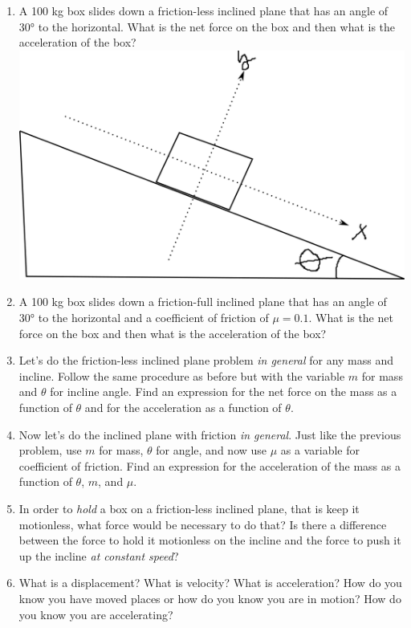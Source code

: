\begin{enumerate}
\item A 100 kg box slides down a friction-less inclined plane that has an angle of \ang{30} to the horizontal. What is the net force on the box and then what is the acceleration of the box?
\includegraphics[scale=0.75]{week-3-incline-plane.png}
\bigskip

\item A 100 kg box slides down a friction-full inclined plane that has an angle of \ang{30} to the horizontal and a coefficient of friction of $\mu=0.1$. What is the net force on the box and then what is the acceleration of the box?\hugeskip

\item Let's do the friction-less inclined plane problem \emph{in general} for any mass and incline. Follow the same procedure as before but with the variable $m$ for mass and $\theta$ for incline angle. Find an expression for the net force on the mass as a function of $\theta$ and for the acceleration as a function of $\theta$.\giantskip 

\item Now let's do the inclined plane with friction \emph{in general}. Just like the previous problem, use $m$ for mass, $\theta$ for angle, and now use $\mu$ as a variable for coefficient of friction. Find an expression for the acceleration of the mass as a function of $\theta$, $m$, and $\mu$. \giantskip

\item In order to \emph{hold} a box on a friction-less inclined plane, that is keep it motionless, what force would be necessary to do that? Is there a difference between the force to hold it motionless on the incline and the force to push it up the incline \emph{at constant speed}? \hugeskip

\item
What is a displacement? What is velocity? What is acceleration? How do you know you have moved places or how do you know you are in motion? How do you know you are accelerating?\bigskip



\end{enumerate}
